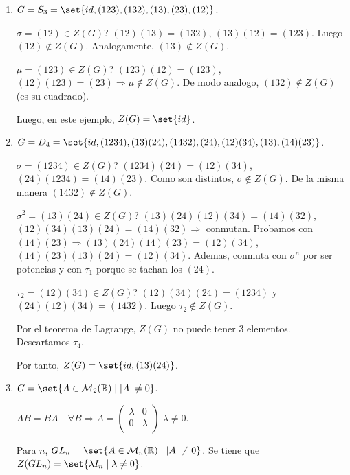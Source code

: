 \begin{example}
	\begin{enumerate}
		\item \(G = S_3 = \set{id, (123),(132),(13),(23),(12)}\).
		      
		      \(\sigma = (12) \in Z(G )\)? \((12)(13) = (132)\), \((13)(12) = (123)\). Luego \((12) \notin Z(G )\). Analogamente, \((13) \notin Z(G )\).
		      
		      \(\mu = (123) \in Z(G )\)? \((123)(12)= (123)\), \((12)(123) = (23 ) \Rightarrow \mu \notin Z(G)\). De modo analogo, \((132) \notin Z(G )\) (es su cuadrado).
		      
		      Luego, en este ejemplo, \(Z(G) = \set{id }\).
		\item \(G = D_4 = \set{id, (1234), (13)(24), (1432), (24), (12)(34), (13), (14)(23)}\).
		      
		      \(\sigma = (1234) \in Z(G )\)? \((1234)(24) = (12)(34)\), \((24)(1234) = (14)(23)\). Como son distintos, \(\sigma \notin Z(G )\). De la misma manera \((1432) \notin Z(G )\).
		      
		      \(\sigma^{2} = (13)(24) \in Z(G) \)? \((13)(24)(12)(34) = (14)(32)\), \((12)(34)(13)(24) = (14)(32) \Rightarrow \) conmutan. Probamos con \((14)(23) \Rightarrow (13)(24)(14)(23) = (12)(34)\), \((14)(23)(13)(24) = (12)(34)\). Ademas, conmuta con \(\sigma^{n } \) por ser potencias y con \(\tau_1 \) porque se tachan los \((24)\).
		      
		      \(\tau_2 = (12)(34) \in Z(G )\)? \((12)(34)(24) = (1234)\) y \((24)(12)(34) = (1432 )\). Luego \(\tau_2 \notin Z(G )\).
		      
		      Por el teorema de Lagrange, \(Z(G) \) no puede tener 3 elementos. Descartamos \(\tau_4 \).
		      
		      Por tanto, \(Z(G) = \set{id, (13)(24 )}\).
		\item \(G = \set{A \in \mathcal{\MakeUppercase{m}}_2(\R) \mid |A| \neq 0 }\).
		      
		      \(AB = BA \quad \forall B \Rightarrow A = \begin{pmatrix}
			      \lambda & 0       \\
			      0       & \lambda \\
		      \end{pmatrix} \; \lambda \neq  0 \).
		      
		      Para \(n \), \(GL_n = \set{A \in \mathcal{\MakeUppercase{m}}_n(\R) \mid |A| \neq 0 }\).  Se tiene que \(Z(GL_n) = \set{\lambda I_n \mid \lambda \neq  0 }\).
	\end{enumerate}
\end{example}

